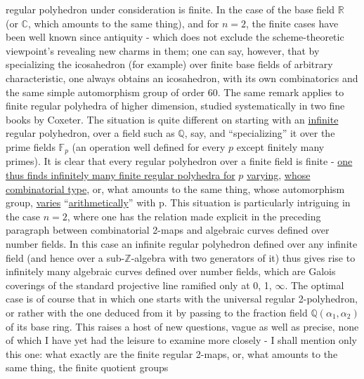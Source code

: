 
regular polyhedron under consideration is finite. In the case of the
base field $\mathbb{R}$ (or $\mathbb{C}$, which amounts to the same thing), and for $n = 2$, the finite
cases have been well known since antiquity - which does not exclude
the scheme-theoretic viewpoint's revealing new charms
in them; one can say, however, that by specializing the icosahedron
(for example) over finite base fields of arbitrary
characteristic, one always obtains an icosahedron, with its own
combinatorics and the same simple automorphism group of order 60.
The same remark applies to finite regular polyhedra
of higher dimension, studied systematically in two
fine books by Coxeter. The situation is quite different on starting
with an \uline{infinite} regular polyhedron, over a field such as $\mathbb{Q}$, say,
and ``specializing'' it over the prime fields $\mathbb{F}_p$ (an operation
well defined for every $p$ except finitely many primes).
It is clear that every regular polyhedron over a finite field is finite -
\uline{one thus finds infinitely many finite regular polyhedra for} $p$
\uline{varying}, \uline{whose combinatorial type}, or, what amounts to the same thing,
whose automorphism group, \uline{varies} ``\uline{arithmetically}'' with p.
This situation is particularly intriguing in the case
$n = 2$, where one has the relation made explicit in the preceding
paragraph between combinatorial 2-maps and algebraic curves
defined over number fields. In this case an infinite regular
polyhedron defined over any infinite field (and hence
over a sub-$\mathbb{Z}$-algebra with two generators of it)
thus gives rise to infinitely many algebraic curves defined over
number fields, which are Galois coverings of the standard projective
line ramified only at 0, 1, $\infty$. The optimal case is of course
that in which one starts with the universal regular 2-polyhedron,
or rather with the one deduced from it by passing to the fraction
field $\mathbb{Q}(\alpha_1,\alpha_2)$ of its base ring. This raises a host of
new questions, vague as well as precise, none of which
I have yet had the leisure to examine more closely - I shall
mention only this one: what exactly are the finite regular
2-maps, or, what amounts to the same thing, the finite quotient groups


